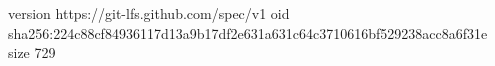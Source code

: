 version https://git-lfs.github.com/spec/v1
oid sha256:224c88cf84936117d13a9b17df2e631a631c64c3710616bf529238acc8a6f31e
size 729
